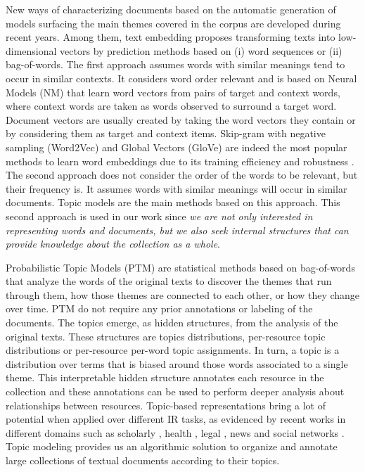 New ways of characterizing documents based on the automatic generation of models surfacing the main themes covered in the corpus are developed during recent years. Among them, text embedding proposes transforming texts into low-dimensional vectors by prediction methods based on (i) word sequences or (ii) bag-of-words. The first approach assumes words with similar meanings tend to occur in similar contexts. It considers word order relevant and is based on Neural Models (NM) that learn word vectors from pairs of target and context words, where context words are taken as words observed to surround a target word. Document vectors are usually created by taking the word vectors they contain or by considering them as target and context items. Skip-gram with negative sampling (Word2Vec) \citep{Mikolov2013c} and Global Vectors (GloVe) \citep{pennington2014} are indeed the most popular methods to learn word embeddings due to its training efficiency and robustness \citep{levy2015}. The second approach does not consider the order of the words to be relevant, but their frequency is. It assumes words with similar meanings will occur in similar documents. Topic models \citep{Deerwester1990, Hofmann2001, Blei2003} are the main methods based on this approach. This second approach is used in our work since \textit{we are not only interested in representing words and documents, but we also seek internal structures that can provide knowledge about the collection as a whole}.

Probabilistic Topic Models (PTM) \citep{Hofmann2001,Blei2003} are statistical methods based on bag-of-words that analyze the words of the original texts to discover the themes that run through them, how those themes are connected to each other, or how they change over time. PTM do not require any prior annotations or labeling of the documents. The topics emerge, as hidden structures, from the analysis of the original texts. These structures are topics distributions, per-resource topic distributions or per-resource per-word topic assignments. In turn, a topic is a distribution over terms that is biased around those words associated to a single theme. This interpretable hidden structure annotates each resource in the collection and these annotations can be used to perform deeper analysis about relationships between resources. Topic-based representations bring a lot of potential when applied over different IR tasks, as evidenced by recent works in different domains such as scholarly  \citep{Gatti2015}, health \citep{Lu2016, TapiNzali2017}, legal \citep{ONeill2017, Greene2016}, news \citep{He2017} and social networks \citep{Cheng2014a}. Topic modeling provides us an algorithmic solution to organize and annotate large collections of textual documents according to their topics.

